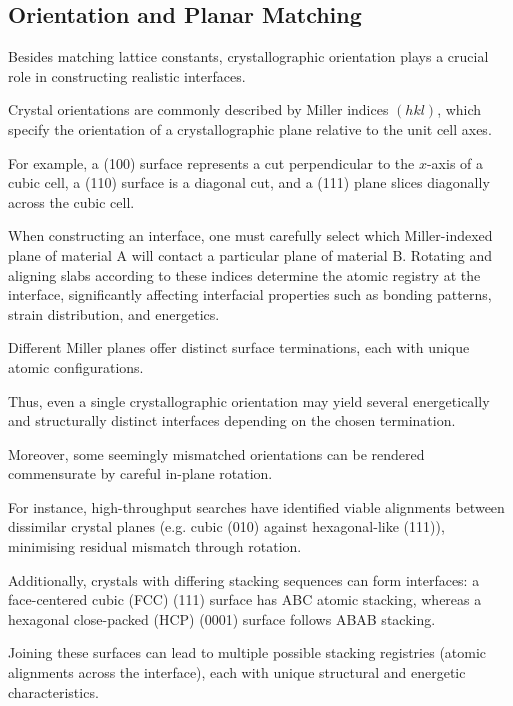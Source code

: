 
\subsection{Orientation and Planar Matching}


Besides matching lattice constants, crystallographic orientation plays a crucial role in constructing realistic
interfaces.

Crystal orientations are commonly described by Miller indices \((hkl)\), which specify the orientation of a
crystallographic plane relative to the unit cell axes.

For example, a (100) surface represents a cut perpendicular to the \(x\)-axis of a cubic cell, a (110) surface is a
diagonal cut, and a (111) plane slices diagonally across the cubic cell.

When constructing an interface, one must carefully select which Miller-indexed plane of material A will contact a
particular plane of material B. Rotating and aligning slabs according to these indices determine the atomic registry at
the interface, significantly affecting interfacial properties such as bonding patterns, strain distribution, and
energetics\cite{artemis_paper}.


Different Miller planes offer distinct surface terminations, each with unique atomic configurations.

Thus, even a single crystallographic orientation may yield several energetically and structurally distinct interfaces
depending on the chosen termination.

Moreover, some seemingly mismatched orientations can be rendered commensurate by careful in-plane rotation.

For instance, high-throughput searches have identified viable alignments between dissimilar crystal planes (e.g.
cubic (010) against hexagonal-like (111)), minimising residual mismatch through rotation.


Additionally, crystals with differing stacking sequences can form interfaces: a face-centered cubic (FCC) (111) surface
has ABC atomic stacking, whereas a hexagonal close-packed (HCP) (0001) surface follows ABAB stacking.

Joining these surfaces can lead to multiple possible stacking registries (atomic alignments across the interface), each
with unique structural and energetic characteristics.

